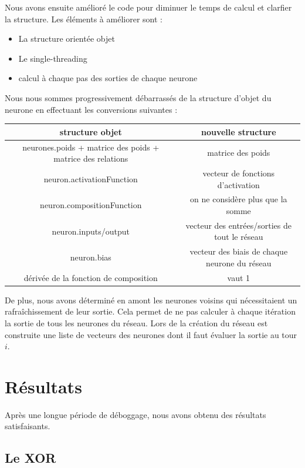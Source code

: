 Nous avons ensuite amélioré le code pour diminuer le temps de calcul et clarfier
la structure. Les éléments à améliorer sont :
\begin{itemize}
  \item La structure orientée objet
  \item Le single-threading
  \item calcul à chaque pas des sorties de chaque neurone
\end{itemize}

\medskip

Nous nous sommes progressivement débarrassés de la structure d'objet du neurone
en effectuant les conversions suivantes :

\medskip

\begin{tabular}{c|c}
   structure objet & nouvelle structure \\
   \hline
   neurones.poids + matrice des poids + matrice des relations & matrice des poids \\
   neuron.activationFunction & vecteur de fonctions d'activation \\
   neuron.compositionFunction & on ne considère plus que la somme \\
   neuron.inputs/output & vecteur des entrées/sorties de tout le réseau \\
   neuron.bias & vecteur des biais de chaque neurone du réseau \\
   dérivée de la fonction de composition & vaut 1
\end{tabular}

\medskip

De plus, nous avons déterminé en amont les neurones voisins qui nécessitaient
un rafraîchissement de leur sortie. Cela permet de ne pas calculer à chaque
itération la sortie de tous les neurones du réseau. Lors de la création du
réseau est construite une liste de vecteurs des neurones dont il faut évaluer
la sortie au tour $i$.

\section{Résultats}

Après une longue période de déboggage, nous avons obtenu des résultats
satisfaisants.


\subsection{Le XOR}

